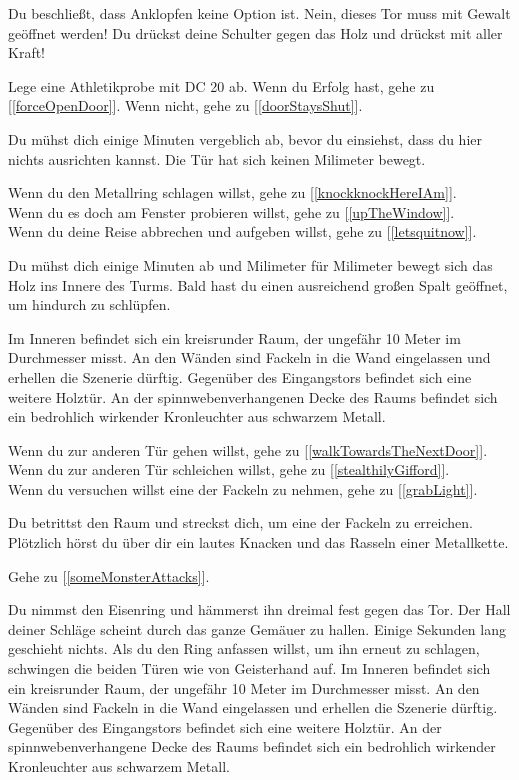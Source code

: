
Du beschließt, dass Anklopfen keine Option ist. Nein, dieses Tor muss mit Gewalt geöffnet werden! Du drückst deine Schulter gegen das Holz und drückst mit aller Kraft!

Lege eine Athletikprobe mit DC 20 ab. Wenn du Erfolg hast, gehe zu [\ref{forceOpenDoor}].
Wenn nicht, gehe zu [\ref{doorStaysShut}].


Du mühst dich einige Minuten vergeblich ab, bevor du einsiehst, dass du hier nichts ausrichten kannst. Die Tür hat sich keinen Milimeter bewegt.

Wenn du den Metallring schlagen willst, gehe zu [\ref{knockknockHereIAm}].
\\Wenn du es doch am Fenster probieren willst, gehe zu [\ref{upTheWindow}].
\\Wenn du deine Reise abbrechen und aufgeben willst, gehe zu [\ref{letsquitnow}].


Du mühst dich einige Minuten ab und Milimeter für Milimeter bewegt sich das Holz ins Innere des Turms. Bald hast du einen ausreichend großen Spalt geöffnet, um hindurch zu schlüpfen.

Im Inneren befindet sich ein kreisrunder Raum, der ungefähr 10 Meter im Durchmesser misst. An den Wänden sind Fackeln in die Wand eingelassen und erhellen die Szenerie dürftig. Gegenüber des Eingangstors befindet sich eine weitere Holztür. An der spinnwebenverhangenen Decke des Raums befindet sich ein bedrohlich wirkender Kronleuchter aus schwarzem Metall.

Wenn du zur anderen Tür gehen willst, gehe zu [\ref{walkTowardsTheNextDoor}].
\\Wenn du zur anderen Tür schleichen willst, gehe zu [\ref{stealthilyGifford}].
\\Wenn du versuchen willst eine der Fackeln zu nehmen, gehe zu [\ref{grabLight}].


Du betrittst den Raum und streckst dich, um eine der Fackeln zu erreichen. Plötzlich hörst du über dir ein lautes Knacken und das Rasseln einer Metallkette.

Gehe zu [\ref{someMonsterAttacks}].


Du nimmst den Eisenring und hämmerst ihn dreimal fest gegen das Tor. Der Hall deiner Schläge scheint durch das ganze Gemäuer zu hallen. Einige Sekunden lang geschieht nichts. Als du den Ring anfassen willst, um ihn erneut zu schlagen, schwingen die beiden Türen wie von Geisterhand auf. Im Inneren befindet sich ein kreisrunder Raum, der ungefähr 10 Meter im Durchmesser misst. An den Wänden sind Fackeln in die Wand eingelassen und erhellen die Szenerie dürftig. Gegenüber des Eingangstors befindet sich eine weitere Holztür. An der spinnwebenverhangene Decke des Raums befindet sich ein bedrohlich wirkender Kronleuchter aus schwarzem Metall.

